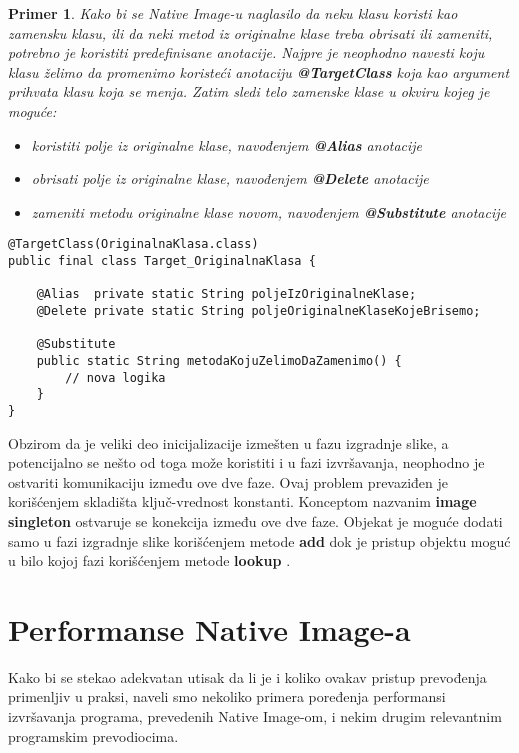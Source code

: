 \documentclass[a4paper]{article}
\newtheorem{primer}{Primer}[section]
\begin{document}
\begin{primer}
Kako bi se Native Image-u naglasilo da neku klasu koristi kao zamensku klasu, ili da neki metod iz
originalne klase treba obrisati ili zameniti, potrebno je koristiti predefinisane anotacije. Najpre je
neophodno navesti koju klasu želimo da promenimo koristeći anotaciju \textbf{@TargetClass} koja kao
argument prihvata klasu koja se menja. Zatim sledi telo zamenske klase u okviru kojeg je moguće: \begin{itemize}
    \item koristiti polje iz originalne klase, navođenjem \textbf{@Alias} anotacije
    \item obrisati polje iz originalne klase, navođenjem \textbf{@Delete} anotacije
    \item zameniti metodu originalne klase novom, navođenjem \textbf{@Substitute} anotacije
\end{itemize}
    \begin{lstlisting}[caption={Primer primene metode zamene},frame=single, label=simple]
@TargetClass(OriginalnaKlasa.class)
public final class Target_OriginalnaKlasa {

    @Alias  private static String poljeIzOriginalneKlase;          
    @Delete private static String poljeOriginalneKlaseKojeBrisemo;

    @Substitute
    public static String metodaKojuZelimoDaZamenimo() {
        // nova logika
    }
}           
    \end{lstlisting}
\end{primer}

Obzirom da je veliki deo inicijalizacije izmešten u fazu izgradnje slike, a potencijalno se nešto od toga
može koristiti i u fazi izvršavanja, neophodno je ostvariti komunikaciju između ove dve faze. Ovaj problem 
prevaziđen je korišćenjem skladišta ključ-vrednost konstanti. Konceptom nazvanim \textbf{image singleton}
ostvaruje se konekcija između ove dve faze. Objekat je moguće dodati samo u fazi izgradnje slike korišćenjem
metode \textbf{add} dok je pristup objektu moguć u bilo kojoj fazi korišćenjem metode \textbf{lookup} 
\cite{PregledSistema}.


\section{Performanse Native Image-a}
Kako bi se stekao adekvatan utisak da li je i koliko ovakav pristup prevođenja primenljiv u praksi, naveli smo nekoliko primera poređenja performansi izvršavanja programa, prevedenih Native Image-om, i nekim drugim relevantnim programskim prevodiocima. 
\end{document}

